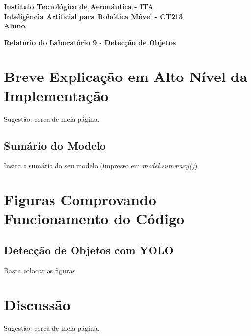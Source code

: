 \documentclass[brazil, 12pt]{article}
\begin{document}
\begin{center}
\textbf{Instituto Tecnológico de Aeronáutica - ITA} \\
\textbf{Inteligência Artificial para Robótica Móvel - CT213} \\
\textbf{Aluno}:     %
\end{center}

\begin{center}
\textbf{Relatório do Laboratório 9 - Detecção de Objetos}
\end{center}
\vspace*{0.5cm}

\section{Breve Explicação em Alto Nível da Implementação}
Sugestão: cerca de meia página.

\subsection{Sumário do Modelo}
Insira o sumário do seu modelo (impresso em \emph{model.summary()})

\section{Figuras Comprovando Funcionamento do Código}

\subsection{Detecção de Objetos com YOLO}
Basta colocar as figuras


\section{Discussão}
Sugestão: cerca de meia página.
\end{document}
